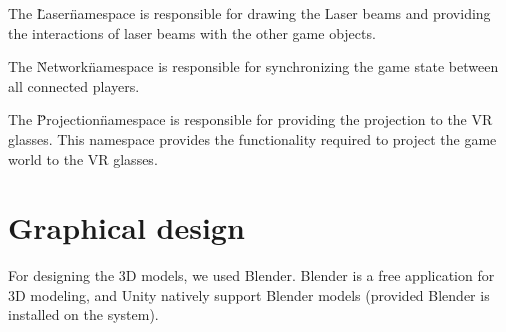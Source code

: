 		The \"Laser\" namespace is responsible for drawing the Laser beams and
		providing the interactions of laser beams with the other game objects.

		The \"Network\" namespace is responsible for synchronizing the game state
		between all connected players.

		The \"Projection\" namespace is responsible for providing the projection to
		the VR glasses. This namespace provides the functionality required to project
		the game world to the VR glasses.

	\section{Graphical design} \label{sec:graphicaldesign}
		For designing the 3D models, we used Blender. Blender is a free application
		for 3D modeling, and Unity natively support Blender models (provided Blender
		is installed on the system).

